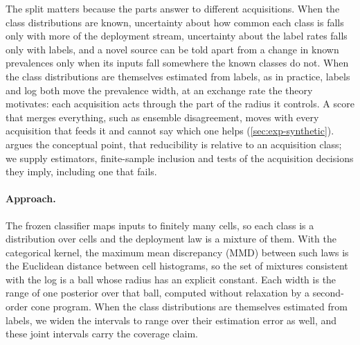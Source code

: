 \documentclass[twoside]{article}
\begin{document}
The split matters because the parts answer to different acquisitions. When the class distributions
are known, uncertainty about how common each class is falls only with more of the deployment stream,
uncertainty about the label rates falls only with labels, and a novel source can be told apart from a
change in known prevalences only when its inputs fall somewhere the known classes do not. When the
class distributions are themselves estimated from labels, as in practice, labels and log both move the
prevalence width, at an exchange rate the theory motivates: each acquisition acts through the part of
the radius it controls. A score that merges everything, such as ensemble disagreement, moves
with every acquisition that feeds it and cannot say which one helps (\cref{sec:exp-synthetic}).
\citet{young2026epistemic} argues the conceptual point, that reducibility is relative to an
acquisition class; we supply estimators, finite-sample inclusion and tests of the acquisition
decisions they imply, including one that fails.

\paragraph{Approach.} The frozen classifier maps inputs to finitely many cells, so each class is a
distribution over cells and the deployment law is a mixture of them. With the categorical kernel,
the maximum mean discrepancy (MMD) between such laws is the Euclidean distance between cell
histograms, so the set of mixtures consistent with the log is a ball whose radius has an explicit
constant. Each width is the range of one posterior over that ball, computed without relaxation by a
second-order cone program. When the class distributions are themselves estimated from labels,
we widen the intervals to range over their estimation error as well, and these joint intervals
carry the coverage claim.
\end{document}
